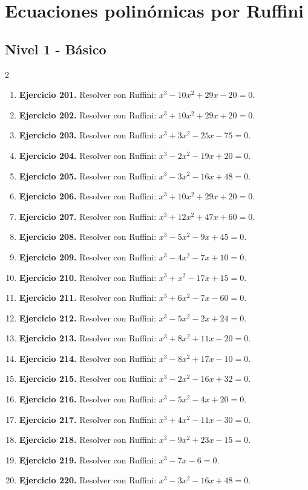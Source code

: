 \documentclass[10pt,a4paper]{article}
\newcommand{\nivel}[1]{\subsection*{#1}\addcontentsline{toc}{subsection}{#1}}
\begin{document}
\section{Ecuaciones polinómicas por Ruffini}
\nivel{Nivel 1 - Básico}
\begin{multicols}{2}
\begin{enumerate}[label=\textbf{\arabic*.}]
\item \textbf{Ejercicio 201.} Resolver con Ruffini: \(x^{3} - 10 x^{2} + 29 x - 20=0\).
\item \textbf{Ejercicio 202.} Resolver con Ruffini: \(x^{3} + 10 x^{2} + 29 x + 20=0\).
\item \textbf{Ejercicio 203.} Resolver con Ruffini: \(x^{3} + 3 x^{2} - 25 x - 75=0\).
\item \textbf{Ejercicio 204.} Resolver con Ruffini: \(x^{3} - 2 x^{2} - 19 x + 20=0\).
\item \textbf{Ejercicio 205.} Resolver con Ruffini: \(x^{3} - 3 x^{2} - 16 x + 48=0\).
\item \textbf{Ejercicio 206.} Resolver con Ruffini: \(x^{3} + 10 x^{2} + 29 x + 20=0\).
\item \textbf{Ejercicio 207.} Resolver con Ruffini: \(x^{3} + 12 x^{2} + 47 x + 60=0\).
\item \textbf{Ejercicio 208.} Resolver con Ruffini: \(x^{3} - 5 x^{2} - 9 x + 45=0\).
\item \textbf{Ejercicio 209.} Resolver con Ruffini: \(x^{3} - 4 x^{2} - 7 x + 10=0\).
\item \textbf{Ejercicio 210.} Resolver con Ruffini: \(x^{3} + x^{2} - 17 x + 15=0\).
\item \textbf{Ejercicio 211.} Resolver con Ruffini: \(x^{3} + 6 x^{2} - 7 x - 60=0\).
\item \textbf{Ejercicio 212.} Resolver con Ruffini: \(x^{3} - 5 x^{2} - 2 x + 24=0\).
\item \textbf{Ejercicio 213.} Resolver con Ruffini: \(x^{3} + 8 x^{2} + 11 x - 20=0\).
\item \textbf{Ejercicio 214.} Resolver con Ruffini: \(x^{3} - 8 x^{2} + 17 x - 10=0\).
\item \textbf{Ejercicio 215.} Resolver con Ruffini: \(x^{3} - 2 x^{2} - 16 x + 32=0\).
\item \textbf{Ejercicio 216.} Resolver con Ruffini: \(x^{3} - 5 x^{2} - 4 x + 20=0\).
\item \textbf{Ejercicio 217.} Resolver con Ruffini: \(x^{3} + 4 x^{2} - 11 x - 30=0\).
\item \textbf{Ejercicio 218.} Resolver con Ruffini: \(x^{3} - 9 x^{2} + 23 x - 15=0\).
\item \textbf{Ejercicio 219.} Resolver con Ruffini: \(x^{3} - 7 x - 6=0\).
\item \textbf{Ejercicio 220.} Resolver con Ruffini: \(x^{3} - 3 x^{2} - 16 x + 48=0\).
\end{enumerate}
\end{multicols}
\end{document}
